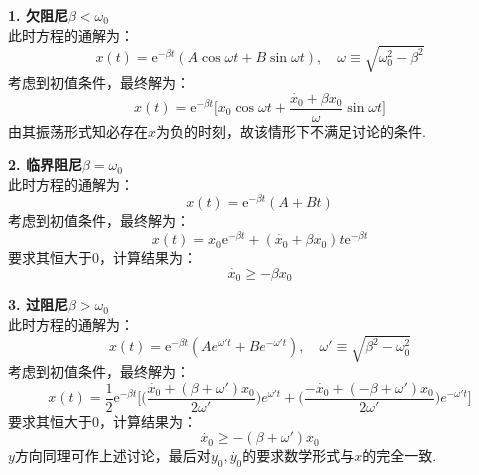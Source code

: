 \documentclass{ctexart}
\begin{document}
\noindent \textbf{1. 欠阻尼$\beta<\omega_0$}\\
此时方程的通解为：
\begin{equation}
  x(t)=\mathrm{e}^{-\beta t}(A\cos{\omega t}+B\sin{\omega t}),\quad \omega\equiv \sqrt{\omega_0^2-\beta^2} \tag{6.11}
\end{equation}
考虑到初值条件，最终解为：
\begin{equation}
  x(t)=\mathrm{e}^{-\beta t}\Big[x_0\cos{\omega t}+\frac{\dot{x_0}+\beta x_0}{\omega}\sin{\omega t}\Big] \tag{6.12}
\end{equation}
由其振荡形式知必存在$x$为负的时刻，故该情形下不满足讨论的条件.

\noindent \textbf{2. 临界阻尼$\beta=\omega_0$}\\
此时方程的通解为：
\begin{equation}
  x(t)=\mathrm{e}^{-\beta t}(A+Bt) \tag{6.13}
\end{equation}
考虑到初值条件，最终解为：
\begin{equation}
  x(t)=x_0\mathrm{e}^{-\beta t}+(\dot{x_0}+\beta x_0)t\mathrm{e}^{-\beta t} \tag{6.14}
\end{equation}
要求其恒大于0，计算结果为：
\begin{equation}
\dot{x_0}\geq-\beta x_0 \tag{6.15}
\end{equation}

\noindent \textbf{3. 过阻尼$\beta>\omega_0$}\\
此时方程的通解为：
\begin{equation}
  x(t)=\mathrm{e}^{-\beta t}(Ae^{\omega' t}+Be^{-\omega' t}), \quad \omega '\equiv \sqrt{\beta^2-\omega_0^2} \tag{6.16}
\end{equation}
考虑到初值条件，最终解为：
\begin{equation}
  x(t)=\displaystyle\frac{1}{2}\mathrm{e}^{-\beta t}\Big[\Big(\frac{\dot{x_0}+(\beta+\omega')x_0}{2\omega'}\Big)e^{\omega' t}+\Big(\frac{-\dot{x_0}+(-\beta+\omega')x_0}{2\omega'}\Big)e^{-\omega' t}\Big] \tag{6.17}
\end{equation}
要求其恒大于0，计算结果为：
\begin{equation}
  \dot{x_0}\geq-(\beta+\omega') x_0 \tag{6.18}
  \end{equation}
$y$方向同理可作上述讨论，最后对$y_0,\dot{y_0}$的要求数学形式与$x$的完全一致.
  
\end{document}
